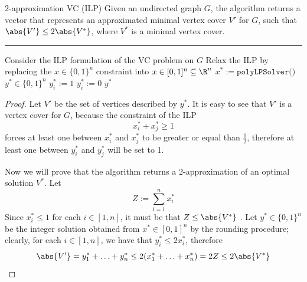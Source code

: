 \documentclass[a4paper, 12pt]{report}
\begin{document}
    \begin{framedalgo}{2-approximation VC (ILP)}
        Given an undirected graph $G$, the algorithm returns a vector that represents an approximated minimal vertex cover $V'$ for $G$, such that $\abs{V'} \le 2 \abs {V^*}$, where $V^*$ is a minimal vertex cover. \\
        \hrule

        \quad
        \label{alg:2-approx_vc_ilp}
        \begin{algorithmic}[1]
                \State Consider the ILP formulation of the VC problem on $G$
                \State Relax the ILP by replacing the $x \in \{0, 1\}^n$ constraint into $x \in [0, 1]^n \subseteq \R^n$
                \State $x^* := \texttt{polyLPSolver()}$
                \State $y^* \in \{0, 1\}^n$
                        \State $y_i^* := 1$
                    \Else
                        \State $y_i^* := 0$
                    \EndIf
                \EndFor
                \State {} $y^*$
            \EndFunction
        \end{algorithmic}
    \end{framedalgo}


    \begin{proof}
        Let $V'$ be the set of vertices described by $y^*$. It is easy to see that $V'$ is a vertex cover for $G$, because the constraint of the ILP $$x^*_i + x^*_j \ge 1$$ forces at least one between $x^*_i$ and $x^*_j$ to be greater or equal than $\frac{1}{2}$, therefore at least one between $y^*_i$ and $y_j^*$ will be set to 1.

        Now we will prove that the algorithm returns a 2-approximation of an optimal solution $V^*$. Let $$Z := \sum_{i = 1}^n{x^*_i}$$ Since $x^*_i \le 1$ for each $i \in [1, n]$, it must be that $Z \le \abs{V^*}$ . Let $y^* \in \{0, 1\}^n$ be the integer solution obtained from $x^* \in [0, 1]^n$ by the rounding procedure; clearly, for each $i \in [1, n]$, we have that $y^*_i \le 2x^*_i$, therefore $$\abs{V'} = y^*_1 + \ldots + y^*_n \le 2 (x^*_1 + \ldots + x^*_n) = 2Z \le 2 \abs{V^*}$$
    \end{proof}
\end{document}
